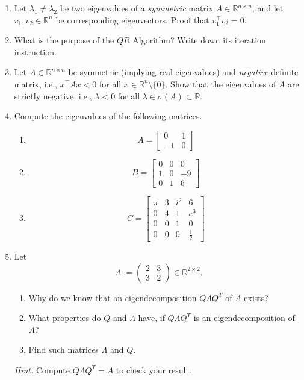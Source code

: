 \begin{enumerate}
	\item Let $\lambda_1 \neq \lambda_2$ be two eigenvalues of a \textit{symmetric} matrix $A \in \mathbb{R}^{n \times n}$, and let 
	$v_1, v_2 \in \mathbb{R}^n$ be corresponding eigenvectors. Proof that $v_1^\top v_2 = 0$. 
\item What is the purpose of the $QR$ Algorithm? Write down its iteration instruction.
\item Let $A \in \mathbb{R}^{n \times n}$ be symmetric (implying real eigenvalues) and \textit{negative} definite matrix, i.e., $x^\top A x < 0$ for all $x \in \mathbb{R}^{n}\setminus \{0\}$. Show that the eigenvalues of $A$ are strictly negative, i.e., $\lambda < 0 $ for all $\lambda \in \sigma(A) \subset \mathbb{R}$.
\item Compute the eigenvalues of the following matrices. %
\begin{enumerate}
	\item $$
	A = \begin{bmatrix}
	0&1\\
	-1&0
	\end{bmatrix}
	$$
	\item
	$$
	B = \begin{bmatrix}
	0&0&0\\
	1&0&-9\\
	0&1&6
	\end{bmatrix}
	$$
	\item $$
	C = \begin{bmatrix}
	\pi& 3& i^2& 6\\
	0 & 4& 1  & e^3\\
	0 & 0& 1  & 0\\
	0 & 0& 0  & \frac{1}{2}
	\end{bmatrix}
	$$
	
	
\end{enumerate}
\item Let $$A:=\begin{pmatrix}2&3\\3&2 \end{pmatrix} \in \mathbb{R}^{2\times 2}. $$
\begin{enumerate}
	\item Why do we know that an eigendecomposition $Q \Lambda Q^T$ of $A$ exists?
	\item What properties do $Q$ and $\Lambda$ have, if $Q \Lambda Q^T$ is an eigendecomposition of $A$?
	\item Find such matrices $\Lambda$ and $Q$.
\end{enumerate}
\textit{Hint:} Compute $Q \Lambda Q^T = A$ to check your result.
\end{enumerate}
 